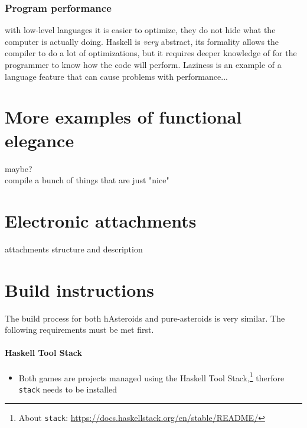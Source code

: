 \documentclass[
  digital, %
  color,   %
  table,   %
  oneside, %
  lof,     %
  lot,     %
]{fithesis3}
\begin{document}
{


\subsection*{Program performance}
with low-level languages it is easier to optimize, they do not hide
what the computer is actually doing. Haskell is \emph{very} abstract,
its formality allows the compiler to do a lot of optimizations, but
it requires deeper knowledge of  for the programmer
to know how the code will perform. Laziness is an example
of a language feature that can cause problems with performance...




\printbibliography[heading=bibintoc] %


\makeatletter\thesis@blocks@clear\makeatother
{} %
\printindex



\appendix %
\newcommand{\requirementitem}[1]{\subsubsection{\textbf{#1}}}

\chapter{More examples of functional elegance}
maybe?\\
compile a bunch of things that are just "nice"


\chapter{Electronic attachments}
attachments structure and description


\chapter{Build instructions}
The build process for both hAsteroids and pure-asteroids is very similar.
The following requirements must be met first.

\requirementitem{Haskell Tool Stack}
\begin{itemize}[\indent]
    \item Both games are projects managed using the Haskell Tool Stack,\footnote{
    About \texttt{stack}: \url{https://docs.haskellstack.org/en/stable/README/}
    } therfore \texttt{stack} needs to be installed
\end{itemize}

}
\end{document}
